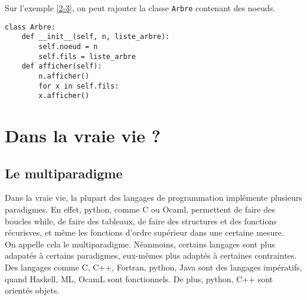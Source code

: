 \begin{example}
	Sur l'exemple \ref{2-3}, on peut rajouter la classe \lstinline|Arbre| contenant des noeuds.
	\begin{lstlisting}
class Arbre:
    def __init__(self, n, liste_arbre):
        self.noeud = n
        self.fils = liste_arbre
    def afficher(self):
        n.afficher()
        for x in self.fils:
        x.afficher()
	\end{lstlisting}
\end{example}

\section{Dans la vraie vie ?}

\subsection{Le multiparadigme}

	Dans la vraie vie, la plupart des langages de programmation implémente plusieurs paradigmes. En effet, python, comme C ou Ocaml, permettent de faire des boucles while, de faire des tableaux, de faire des structures et des fonctions récurisves, et même les fonctions d'ordre supérieur dans une certaine mesure.\\
	
	On appelle cela le multiparadigme. Néanmoins, certains langages sont plus adapatés à certains paradigmes, eux-mêmes plus adaptés à certaines contraintes.\\
	
	Des langages comme C, C++, Fortran, python, Java sont des langages impératifs, quand Haskell, ML, OcamL sont fonctionnels. De plus, python, C++ sont orientés objets.

